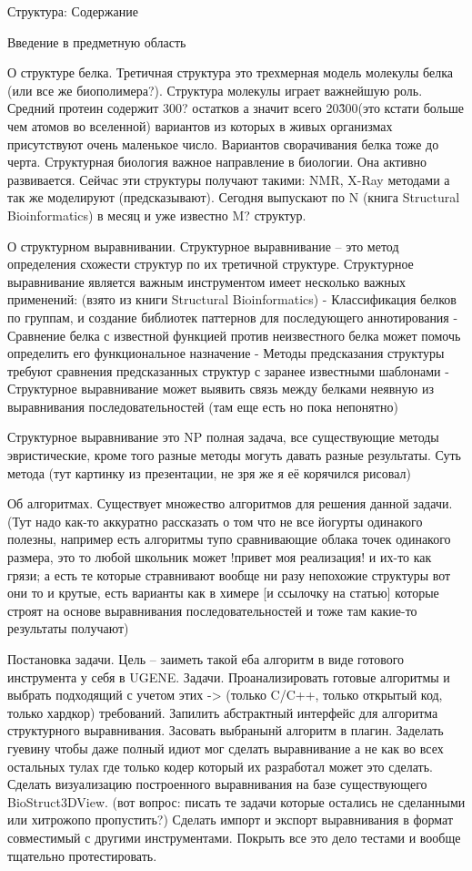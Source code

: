 \documentclass[a4paper, 14pt, titlepage, utf8]{extarticle}
\begin{document}
Структура:
Содержание

Введение в предметную область

О структуре белка.
Третичная структура это трехмерная модель молекулы белка (или все же биополимера?). Структура молекулы играет важнейшую роль. Средний протеин содержит 300? остатков а значит всего 20\^300(это кстати больше чем атомов во вселенной) вариантов из которых в живых организмах присутствуют очень маленькое число. Вариантов сворачивания белка тоже до черта. Структурная биология важное направление в биологии. Она активно развивается. Сейчас эти структуры получают такими: NMR, X-Ray методами а так же моделируют (предсказывают). Сегодня выпускают по N (книга Structural Bioinformatics) в месяц и уже известно M? структур.

О структурном выравнивании.
Структурное выравнивание -- это метод определения схожести структур по их третичной структуре.%
Структурное выравнивание является важным инструментом имеет несколько важных применений:
	(взято из книги Structural Bioinformatics)
	- Классификация белков по группам, и создание библиотек паттернов для последующего аннотирования
	- Сравнение белка с известной функцией против неизвестного белка может помочь определить его функциональное назначение 
	- Методы предсказания структуры требуют сравнения предсказанных структур с заранее известными шаблонами
	- Структурное выравнивание может выявить связь между белками неявную из выравнивания последовательностей (там еще есть но пока непонятно)

Структурное выравнивание это NP полная задача, все существующие методы эвристические, кроме того разные методы могуть давать разные результаты.
Суть метода (тут картинку из презентации, не зря же я её корячился рисовал)

Об алгоритмах.
Существует множество алгоритмов для решения данной задачи. (Тут надо как-то аккуратно рассказать о том что не все йогурты одинакого полезны, например есть алгоритмы тупо сравнивающие облака точек одинакого размера, это то любой школьник может !привет моя реализация! и их-то как грязи; а есть те которые стравнивают вообще ни разу непохожие структуры вот они то и крутые, есть варианты как в химере [и ссылочку на статью] которые строят на основе выравнивания последовательностей и тоже там какие-то результаты получают)
 
Постановка задачи.
Цель -- заиметь такой еба алгоритм в виде готового инструмента у себя в UGENE. 
Задачи.
Проанализировать готовые алгоритмы и выбрать подходящий с учетом этих -> (только C/C++, только открытый код, только хардкор) требований. Запилить абстрактный интерфейс для алгоритма структурного выравнивания. Засовать выбранынй алгоритм в плагин. Заделать гуевину чтобы даже полный идиот мог сделать выравнивание а не как во всех остальных тулах где только кодер который их разработал может это сделать. Сделать визуализацию построенного выравнивания на базе существующего BioStruct3DView. (вот вопрос: писать те задачи которые остались не сделанными или хитрожопо пропустить?) Сделать импорт и экспорт выравнивания в формат совместимый с другими инструментами. Покрыть все это дело тестами и вообще тщательно протестировать.
\end{document}
